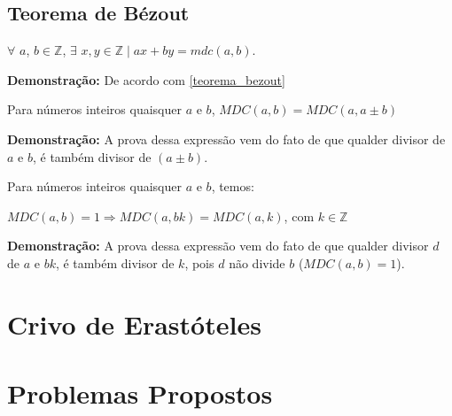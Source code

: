 \subsection{Teorema de Bézout}

\begin{theorem}\label{teorema_bezout}
$\forall$ $a$, $b \in \mathbb{Z}$, $\exists$ $x, y \in \mathbb{Z} \mid ax + by = mdc(a, b).$
\end{theorem}
\textbf{Demonstração:}
De acordo com \autoref{teorema_bezout}




\begin{corollary}\label{corolario_gcd_soma}
Para números inteiros quaisquer $a$ e $b$, $MDC(a,b) = MDC(a,a \pm b)$
\end{corollary}
\textbf{Demonstração:}
A prova dessa expressão vem do fato de que qualder divisor de $a$ e $b$, é também divisor de $(a \pm b)$.



\begin{corollary}\label{corolario_gcd_produto}
Para números inteiros quaisquer $a$ e $b$, temos:

$MDC(a,b) = 1 \Rightarrow MDC(a,bk) = MDC(a,k)$, com $k \in \mathbb{Z}$
\end{corollary}
\textbf{Demonstração:}
A prova dessa expressão vem do fato de que qualder divisor $d$ de $a$ e $bk$, é também divisor de $k$, pois $d$ não divide $b$ ($MDC(a,b) = 1$).



\section{Crivo de Erastóteles}






\section{Problemas Propostos}


